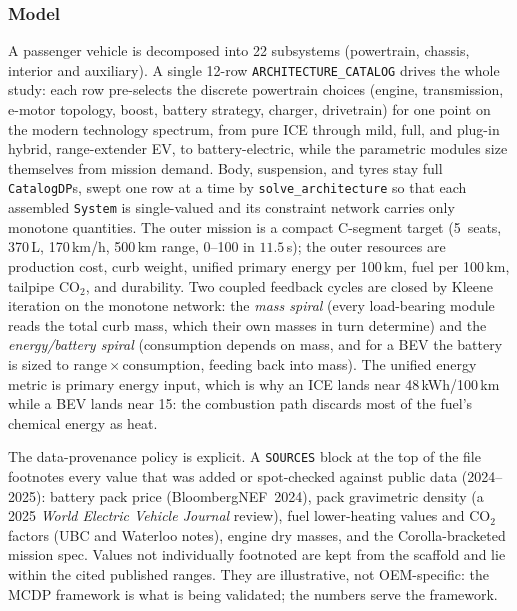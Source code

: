 \documentclass[11pt,a4paper]{article}
\begin{document}
\subsubsection*{Model}
A passenger vehicle is decomposed into 22 subsystems (powertrain, chassis,
interior and auxiliary). A single 12-row \texttt{ARCHITECTURE\_CATALOG}
drives the whole study: each row pre-selects the discrete powertrain
choices (engine, transmission, e-motor topology, boost, battery strategy,
charger, drivetrain) for one point on the modern technology spectrum, from
pure ICE through mild, full, and plug-in hybrid, range-extender EV, to
battery-electric, while the parametric modules size themselves from
mission demand. Body, suspension, and tyres stay full \texttt{CatalogDP}s,
swept one row at a time by \texttt{solve\_architecture} so that each
assembled \texttt{System} is single-valued and its constraint network
carries only monotone quantities. The outer mission is a compact
C-segment target (5~seats, 370\,L, 170\,km/h, 500\,km range, 0--100 in
$11.5$\,s); the outer resources are production cost, curb weight, unified
primary energy per 100\,km, fuel per 100\,km, tailpipe CO$_2$, and
durability. Two coupled feedback cycles are closed by Kleene iteration on
the monotone network: the \emph{mass spiral} (every load-bearing module
reads the total curb mass, which their own masses in turn determine) and
the \emph{energy/battery spiral} (consumption depends on mass, and for a
BEV the battery is sized to range\,$\times$\,consumption, feeding back into
mass). The unified energy metric is primary energy input, which is why an
ICE lands near 48\,kWh/100\,km while a BEV lands near 15: the combustion
path discards most of the fuel's chemical energy as heat.

The data-provenance policy is explicit. A \texttt{SOURCES} block at the top
of the file footnotes every value that was added or spot-checked against
public data (2024--2025): battery pack price (BloombergNEF~2024), pack
gravimetric density (a 2025 \emph{World Electric Vehicle Journal} review),
fuel lower-heating values and CO$_2$ factors (UBC and Waterloo notes),
engine dry masses, and the Corolla-bracketed mission spec. Values not
individually footnoted are kept from the scaffold and lie within the cited
published ranges. They are illustrative, not OEM-specific: the MCDP
framework is what is being validated; the numbers serve the framework.
\end{document}
